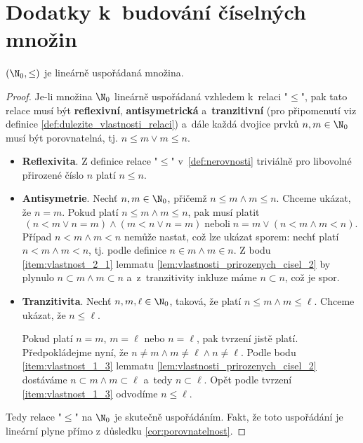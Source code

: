 \chapter{Dodatky k~budování číselných množin}\label{chap:dodatky_k_budovani_cis_mn}
\begin{theorem}
    $(\N_0,\leq)$ je lineárně uspořádaná množina.
\end{theorem}
\begin{proof}
    Je-li množina $\N_0$ lineárně uspořádaná vzhledem k~relaci "$\leq$", pak tato relace musí být \textbf{reflexivní}, \textbf{antisymetrická} a~\textbf{tranzitivní} (pro připomenutí viz definice \ref{def:dulezite_vlastnosti_relaci}) a~dále každá dvojice prvků $n,m\in\N_0$ musí být porovnatelná, tj. $n\leq m\lor m\leq n$.
    \begin{itemize}
        \item \textbf{Reflexivita}. Z definice relace "$\leq$" v~\ref{def:nerovnosti} triviálně pro libovolné přirozené číslo $n$ platí $n\leq n$.
        \item \textbf{Antisymetrie}. Nechť $n,m\in\N_0$, přičemž $n\leq m \land m\leq n$. Chceme ukázat, že $n=m$. Pokud platí $n\leq m \land m\leq n$, pak musí platit
        \begin{equation*}
            (n<m\lor n=m) \land (m<n\lor n=m)\;\text{neboli}\;n=m\lor (n<m\land m<n).
        \end{equation*}
        Případ $n<m\land m<n$ nemůže nastat, což lze ukázat sporem: nechť platí $n<m\land m<n$, tj. podle definice $n\in m\land m\in n$. Z bodu \ref{item:vlastnost_2_1} lemmatu \ref{lem:vlastnosti_prirozenych_cisel_2} by plynulo $n\subset m\land m\subset n$ a~z~tranzitivity inkluze máme $n\subset n$, což je spor.
        \item \textbf{Tranzitivita}. Nechť $n,m,\ell\in\N_0$, taková, že platí $n\leq m \land m\leq\ell$. Chceme ukázat, že $n\leq\ell$.\par
        Pokud platí $n=m$, $m=\ell$ nebo $n=\ell$, pak tvrzení jistě platí. Předpokládejme nyní, že $n\neq m\land m\neq\ell\land n\neq\ell$. Podle bodu \ref{item:vlastnost_1_3} lemmatu \ref{lem:vlastnosti_prirozenych_cisel_2} dostáváme $n\subset m\land m\subset\ell$ a~tedy $n\subset\ell$. Opět podle tvrzení \ref{item:vlastnost_1_3} odvodíme $n\leq\ell$.
    \end{itemize}
    Tedy relace "$\leq$" na $\N_0$ je skutečně uspořádáním. Fakt, že toto uspořádání je lineární plyne přímo z důsledku \ref{cor:porovnatelnost}.
\end{proof}